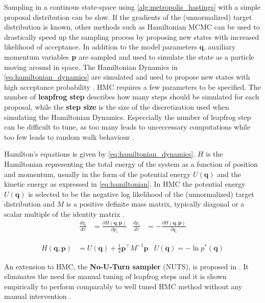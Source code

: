 Sampling in a continous state-space using \cref{alg:metropolis_hastings} with a simple proposal distribution can be slow. If the gradients of the (unnormalized) target distribution is known, other methods such as Hamiltonian MCMC can be used to drastically speed up the sampling process by proposing new states with increased likelihood of acceptance. In addition to the model parameters $\mathbf{q}$, auxiliary momentum variables $\bf p$ are sampled and used to simulate the state as a particle moving around in space. The Hamiltonian Dynamics in \cref{eq:hamiltonian_dynamics} are simulated and used to propose new states with high acceptance probability \cite{neal2012mcmc,murphy,hoffman2011nouturn,robert2018accelerating}. HMC requires a few parameters to be specified. The number of \textbf{leapfrog step} describes how many steps should be simulated for each proposal, while the \textbf{step size} is the size of the discretization used when simulating the Hamiltonian Dynamics. Especcially the number of leapfrog step can be difficult to tune, as too many leads to unceccessary computations while too few leads to random walk behaviour \cite{hoffman2011nouturn}. 

Hamilton's equations is given by \cref{eq:hamiltonian_dynamics}. $H$ is the Hamiltonian representing the total energy of the system as a function of position and momentum, usually in the form of the potential energy $U(\mathbf{q})$ and the kinetic energy as expressed in \cref{eq:hamiltonian}. In HMC the potential energy $U(\mathbf{q})$ is selected to be the negative log likelihood of the (unnormalized) target distribution and $M$ is a positive definite mass matrix, typically diagonal or a scalar multiple of the identity matrix \cite{neal2012mcmc}. 
\begin{align}\label{eq:hamiltonian_dynamics}
    \frac{d q_i}{d\tau} &= \frac{\partial H(\mathbf{q}, \mathbf{p})}{\partial p_i} & \frac{d p_i}{d\tau} &= -\frac{\partial H(\mathbf{q}, \mathbf{p})}{\partial q_i}
\end{align}

\begin{align}\label{eq:hamiltonian}
    H(\mathbf{q}, \mathbf{p}) &= U(\mathbf{q}) + \frac{1}{2} \mathbf{p}^\intercal M^{-1} \mathbf{p} & U(\mathbf{q}) = - \ln p^*(\mathbf{q})
\end{align}

An extension to HMC, the \textbf{No-U-Turn sampler} (NUTS), is proposed in \cite{hoffman2011nouturn}. It eliminates the need for manual tuning of leapfrog steps and it is shown empirically to perform comparably to well tuned HMC method without any manual intervention \cite{hoffman2011nouturn}.



